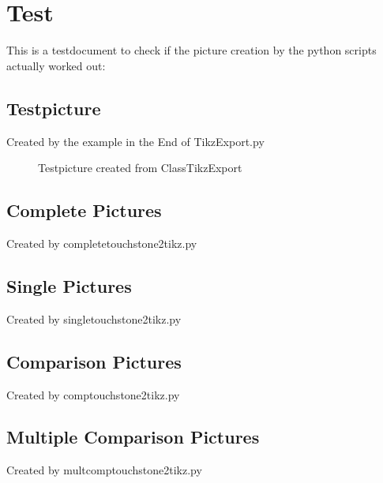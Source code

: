 \documentclass[DIV=12,
               fleqn,
               numbers=noenddot,
               headsepline,
               twoside,
               captions=tableabove]{scrreprt}
\newcommand{\instikz}[2]{
	\begin{figure}[hbtp]
		\centering
		
		\caption{#2}
		\label{plot:#1}
	\end{figure}	
}
\begin{document}
	\chapter{Test}

	This is a testdocument to check if the picture creation
	by the python scripts actually worked out:

	\newlength\figureheight 
	\newlength\figurewidth 
	\setlength\figureheight{7cm} 
	\setlength\figurewidth{\textwidth}
	\addtolength{\figurewidth}{-2cm}

	\section{Testpicture}
	Created by the example in the End of TikzExport.py
	\instikz{test}{Testpicture created from ClassTikzExport}
	
	\clearpage
	\section{Complete Pictures}
	Created by completetouchstone2tikz.py
	

	\clearpage
	\section{Single Pictures}
	Created by singletouchstone2tikz.py
	
	
	\clearpage
	\section{Comparison Pictures}
	Created by comptouchstone2tikz.py
	

	\clearpage
	\section{Multiple Comparison Pictures}
	Created by multcomptouchstone2tikz.py
	
	
\end{document}
